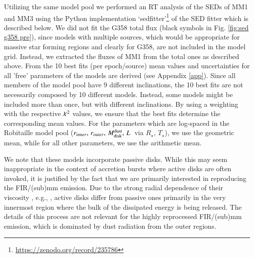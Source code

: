 Utilizing the same model pool we performed an RT analysis of the SEDs of MM1 and MM3 using the Python implementation `sedfitter'\footnote{\url{https://zenodo.org/record/235786}} of the SED fitter \citep{2007ApJS..169..328R} which is described below. We did not fit the G358 total flux (black symbols in Fig. \ref{fig:sed g358 pre}), since %
models with multiple sources, which would be appropriate for massive star forming regions and clearly for G358, are not included in the \citet{2017A&A...600A..11R} model grid.
Instead, we extracted the fluxes of MM1 from the total ones as described above.
From the 10 best fits (per epoch/source) mean values and uncertainties for all 'free' parameters of the models 
are derived (see Appendix \ref{app}).
Since all members of the model pool have 9 different inclinations, the 10 best fits are not necessarily composed by 10 different models. Instead, some models might be included more than once, but with different inclinations.
By using a weighting with the respective ${\goodchi}^2$ values, we ensure that the best fits determine the corresponding mean values. For the parameters which are log-spaced in the Robitaille model pool ($r_{inner},\, r_{outer},\, M_{\rm disk}^{\rm dust},\,  L$\, via $R_\star,\, T_\star$), we use the geometric mean, while for all other parameters, we use the arithmetic mean.

We note that these models incorporate passive disks. While this may seem inappropriate in the context of accretion bursts where active disks are often invoked, it is justified by the fact that we are primarily interested in reproducing the FIR/(sub)mm emission. Due to the strong radial dependence of their viscosity
, e.g.,  \citet{1981ARA&A..19..137P}, active disks differ from passive ones primarily in the very innermost region where the bulk of the dissipated energy is being released. The details of this process are not relevant for the highly reprocessed FIR/(sub)mm emission, 
which is dominated by dust radiation from the outer regions.

